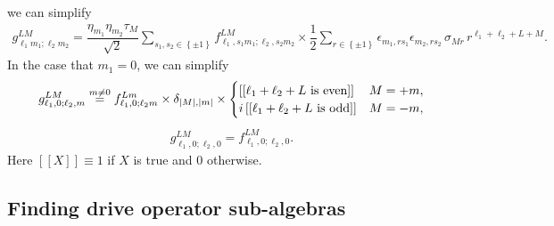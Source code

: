 \documentclass[nofootinbib,notitlepage,11pt]{revtex4-2}
\renewcommand{\t}{\text} %
\newcommand{\f}[2]{\dfrac{#1}{#2}} %
\renewcommand{\sp}[1]{\left[#1\right]} %
\renewcommand{\set}[1]{\left\{#1\right\}} %
\newcommand{\1}{\mathds{1}}
\begin{document}
we can simplify
\begin{align}
  g_{\ell_1m_1;\ell_2m_2}^{LM}
  = \f{\eta_{m_1}\eta_{m_2}\tau_M}{\sqrt2}
  \sum_{s_1,s_2\in\set{\pm1}} f_{\ell_1,s_1m_1;\ell_2,s_2m_2}^{LM}
  \times \f12 \sum_{r\in\set{\pm1}}
  \epsilon_{m_1,r s_1} \epsilon_{m_2,r s_2} \,
  \sigma_{Mr} \, r^{\ell_1+\ell_2+L+M}.
  \label{eq:drive_struct}
\end{align}
In the case that $m_1=0$, we can simplify
\begin{align}
  g_{\ell_1,0;\ell_2,m}^{LM}
  \stackrel{m\ne 0}{=} f_{\ell_1,0;\ell_2 m}^{Lm}
  \times \delta_{\abs{M},\abs{m}} \times
  \begin{cases}
    \sp{\sp{\ell_1+\ell_2+L~\t{is even}}} & M = +m, \\
    i \sp{\sp{\ell_1+\ell_2+L~\t{is odd}}} & M = -m,
  \end{cases}
\end{align}
\begin{align}
  g_{\ell_1,0;\ell_2,0}^{LM} = f_{\ell_1,0;\ell_2,0}^{LM}.
\end{align}
Here $\sp{\sp{X}}\equiv1$ if $X$ is true and $0$ otherwise.

\subsection{Finding drive operator sub-algebras}
\end{document}
